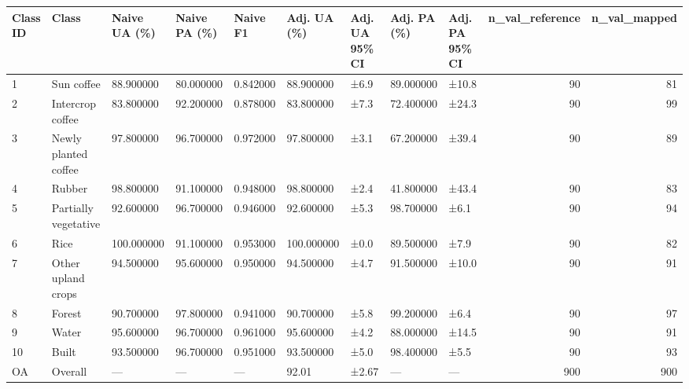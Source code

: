 \begin{tabular}{lllllllllrr}
\toprule
Class ID & Class & Naive UA (\%) & Naive PA (\%) & Naive F1 & Adj. UA (\%) & Adj. UA 95\% CI & Adj. PA (\%) & Adj. PA 95\% CI & n\_val\_reference & n\_val\_mapped \\
\midrule
1 & Sun coffee & 88.900000 & 80.000000 & 0.842000 & 88.900000 & ±6.9 & 89.000000 & ±10.8 & 90 & 81 \\
2 & Intercrop coffee & 83.800000 & 92.200000 & 0.878000 & 83.800000 & ±7.3 & 72.400000 & ±24.3 & 90 & 99 \\
3 & Newly planted coffee & 97.800000 & 96.700000 & 0.972000 & 97.800000 & ±3.1 & 67.200000 & ±39.4 & 90 & 89 \\
4 & Rubber & 98.800000 & 91.100000 & 0.948000 & 98.800000 & ±2.4 & 41.800000 & ±43.4 & 90 & 83 \\
5 & Partially vegetative & 92.600000 & 96.700000 & 0.946000 & 92.600000 & ±5.3 & 98.700000 & ±6.1 & 90 & 94 \\
6 & Rice & 100.000000 & 91.100000 & 0.953000 & 100.000000 & ±0.0 & 89.500000 & ±7.9 & 90 & 82 \\
7 & Other upland crops & 94.500000 & 95.600000 & 0.950000 & 94.500000 & ±4.7 & 91.500000 & ±10.0 & 90 & 91 \\
8 & Forest & 90.700000 & 97.800000 & 0.941000 & 90.700000 & ±5.8 & 99.200000 & ±6.4 & 90 & 97 \\
9 & Water & 95.600000 & 96.700000 & 0.961000 & 95.600000 & ±4.2 & 88.000000 & ±14.5 & 90 & 91 \\
10 & Built & 93.500000 & 96.700000 & 0.951000 & 93.500000 & ±5.0 & 98.400000 & ±5.5 & 90 & 93 \\
OA & Overall & — & — & — & 92.01 & ±2.67 & — & — & 900 & 900 \\
\bottomrule
\end{tabular}
